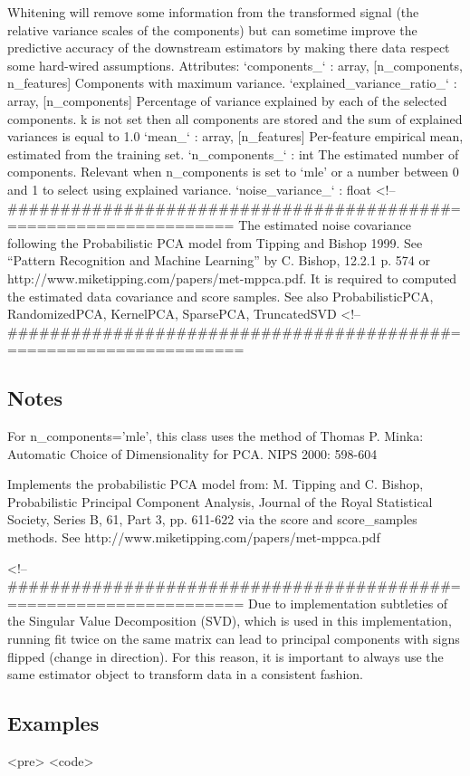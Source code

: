 Whitening will remove some information from the transformed signal (the relative variance scales of the components) but can sometime improve the predictive accuracy of the downstream estimators by making there data respect some hard-wired assumptions.
Attributes:	
`components_` : array, [n_components, n_features]
Components with maximum variance.
`explained_variance_ratio_` : array, [n_components]
Percentage of variance explained by each of the selected components. k is not set then all components are stored and the sum of explained variances is equal to 1.0
`mean_` : array, [n_features]
Per-feature empirical mean, estimated from the training set.
`n_components_` : int
The estimated number of components. Relevant when n_components is set to ‘mle’ or a number between 0 and 1 to select using explained variance.
`noise_variance_` : float
<!-- ##########################################======================== %
The estimated noise covariance following the Probabilistic PCA model from Tipping and Bishop 1999. See “Pattern Recognition and Machine Learning” by C. Bishop, 12.2.1 p. 574 or http://www.miketipping.com/papers/met-mppca.pdf. It is required to computed the estimated data covariance and score samples.
See also ProbabilisticPCA, RandomizedPCA, KernelPCA, SparsePCA, TruncatedSVD
<!-- ##########################################========================= %
\subsection*{Notes}
For n_components=’mle’, this class uses the method of Thomas P. Minka: Automatic Choice of Dimensionality for PCA. NIPS 2000: 598-604

Implements the probabilistic PCA model from: M. Tipping and C. Bishop, Probabilistic Principal Component Analysis, Journal of the Royal Statistical Society, Series B, 61, Part 3, pp. 611-622 via the score and score_samples methods. See http://www.miketipping.com/papers/met-mppca.pdf

<!-- ##########################################========================= %
Due to implementation subtleties of the Singular Value Decomposition (SVD), which is used in this implementation, running fit twice on the same matrix can lead to principal components with signs flipped (change in direction). For this reason, it is important to always use the same estimator object to transform data in a consistent fashion.
\subsection*{Examples}
<pre>
<code>

